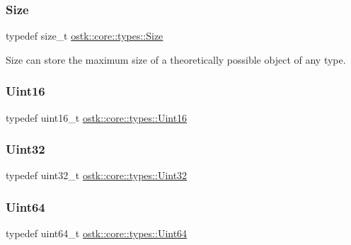 \subsubsection{\texorpdfstring{Size}{Size}}
{\footnotesize\ttfamily typedef size\+\_\+t \hyperlink{namespaceostk_1_1core_1_1types_acf68f214a245e35a7c1994c84dc56746}{ostk\+::core\+::types\+::\+Size}}



Size can store the maximum size of a theoretically possible object of any type. 

\mbox{\label{namespaceostk_1_1core_1_1types_aacabe89aeeaa93c0bbfe3b4e04454e45}} 
\subsubsection{\texorpdfstring{Uint16}{Uint16}}
{\footnotesize\ttfamily typedef uint16\+\_\+t \hyperlink{namespaceostk_1_1core_1_1types_aacabe89aeeaa93c0bbfe3b4e04454e45}{ostk\+::core\+::types\+::\+Uint16}}

\mbox{\label{namespaceostk_1_1core_1_1types_a821738d6849fcc24698839971deccbb9}} 
\subsubsection{\texorpdfstring{Uint32}{Uint32}}
{\footnotesize\ttfamily typedef uint32\+\_\+t \hyperlink{namespaceostk_1_1core_1_1types_a821738d6849fcc24698839971deccbb9}{ostk\+::core\+::types\+::\+Uint32}}

\mbox{\label{namespaceostk_1_1core_1_1types_a0c1d18a4608c61f9cac139054b725689}} 
\subsubsection{\texorpdfstring{Uint64}{Uint64}}
{\footnotesize\ttfamily typedef uint64\+\_\+t \hyperlink{namespaceostk_1_1core_1_1types_a0c1d18a4608c61f9cac139054b725689}{ostk\+::core\+::types\+::\+Uint64}}

